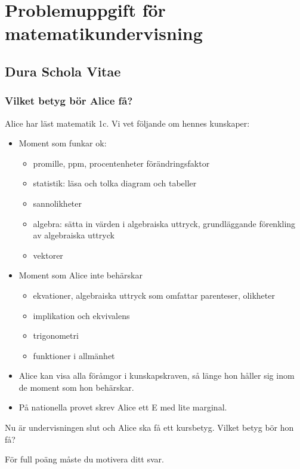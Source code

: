 \part*{Problemuppgift för matematikundervisning}

\chapter{Dura Schola Vitae}

\setcounter{section}{0}
\section{Vilket betyg bör Alice få?}
Alice har läst matematik 1c. Vi vet följande om hennes kunskaper:

\begin{itemize}
  \item Moment som funkar ok:
    \begin{itemize}
      \item promille, ppm, procentenheter förändringsfaktor
      \item statistik: läsa och tolka diagram och tabeller
      \item sannolikheter
      \item algebra: sätta in värden i algebraiska uttryck, grundläggande förenkling av algebraiska uttryck
      \item vektorer
    \end{itemize}
  \item Moment som Alice inte behärskar
    \begin{itemize}
      \item ekvationer, algebraiska uttryck som omfattar parenteser, olikheter
      \item implikation och ekvivalens
      \item trigonometri
      \item funktioner i allmänhet
    \end{itemize}
  \item Alice kan visa alla föråmgor i kunskapskraven, så länge hon håller sig inom de moment som hon behärskar.
  \item På nationella provet skrev Alice ett E med lite marginal.
\end{itemize}

Nu är undervisningen slut och Alice ska få ett kursbetyg. Vilket betyg bör hon få?

För full poäng måste du motivera ditt svar.